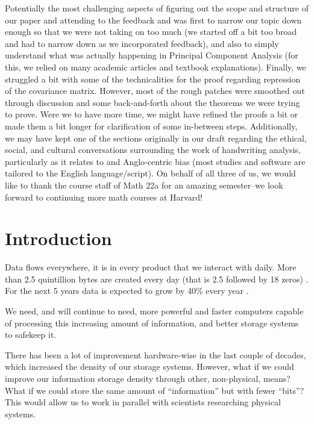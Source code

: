 \documentclass[12pt]{report}
\begin{document}
    Potentially the most challenging aspects of figuring out the scope and structure of our paper and attending to the feedback and was first to narrow our topic down enough so that we were not taking on too much (we started off a bit too broad and had to narrow down as we incorporated feedback), and also to simply understand what was actually happening in Principal Component Analysis (for this, we relied on many academic articles and textbook explanations). Finally, we struggled a bit with some of the technicalities for the proof regarding repression of the covariance matrix. However, most of the rough patches were smoothed out through discussion and some back-and-forth about the theorems we were trying to prove. Were we to have more time, we might have refined the proofs a bit or made them a bit longer for clarification of some in-between steps. Additionally, we may have kept one of the sections originally in our draft regarding the ethical, social, and cultural conversations surrounding the work of handwriting analysis, particularly as it relates to and Anglo-centric bias (most studies and software are tailored to the English language/script). On behalf of all three of us, we would like to thank the course staff of Math 22a for an amazing semester--we look forward to continuing more math courses at Harvard!
    
    
    \pagebreak
    
    \tableofcontents
    
    \pagebreak

    \chapter{Introduction}
        Data flows everywhere, it is in every product that we interact with daily. More than 2.5 quintillion bytes are created every day (that is 2.5 followed by 18 zeros) \cite{alexaqz_2015}. For the next 5 years data is expected to grow by 40\% every year \cite{marr_2022}.

        We need, and will continue to need, more powerful and faster computers capable of processing this increasing amount of information, and better storage systems to safekeep it.

        There has been a lot of improvement hardware-wise in the last couple of decades, which increased the density of our storage systems. However, what if we could improve our information storage density through other, non-physical, means? What if we could store the same amount of ``information'' but with fewer ``bits''? This would allow us to work in parallel with scientists researching physical systems.
        
\end{document}
